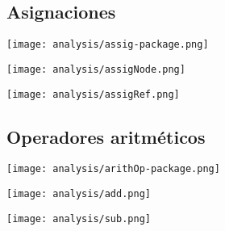\subsection {Asignaciones}
\begin{center}
\texttt{[image: analysis/assig-package.png]} 
\end{center}

\begin{multicols}{2}
\begin{center}
\texttt{[image: analysis/assigNode.png]} 
\end{center}
\columnbreak
\begin{center}
\texttt{[image: analysis/assigRef.png]} 
\end{center}
\end{multicols}

\subsection {Operadores aritméticos}
\begin{center}
\texttt{[image: analysis/arithOp-package.png]} 
\end{center}

\begin{multicols}{2}
\begin{center}
\texttt{[image: analysis/add.png]} 
\end{center}
\columnbreak
\begin{center}
\texttt{[image: analysis/sub.png]} 
\end{center}
\end{multicols}

